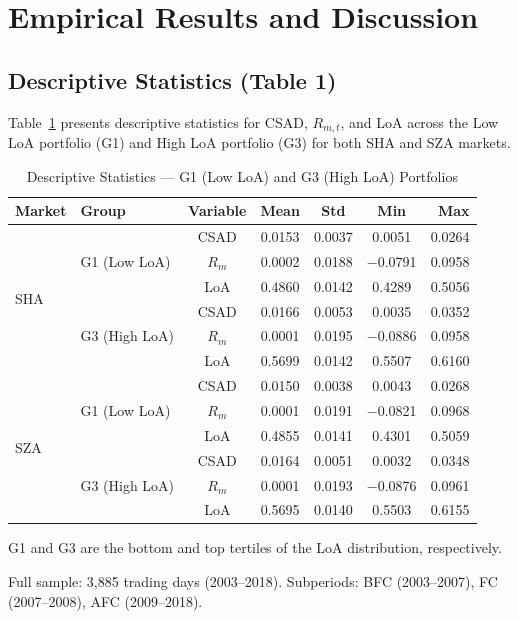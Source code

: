 \documentclass[12pt, a4paper]{article}
\begin{document}
\section{Empirical Results and Discussion}

\subsection{Descriptive Statistics (Table 1)}

Table~\ref{tab:descriptive} presents descriptive statistics for CSAD, $R_{m,t}$, and LoA across the Low LoA portfolio (G1) and High LoA portfolio (G3) for both SHA and SZA markets.

\begin{table}[H]
  \centering
  \caption{Descriptive Statistics — G1 (Low LoA) and G3 (High LoA) Portfolios}
  \label{tab:descriptive}
  \begin{threeparttable}
  \begin{tabular}{llccccr}
    \toprule
    Market & Group & Variable & Mean & Std & Min & Max \\
    \midrule
    \multirow{6}{*}{SHA}
      & \multirow{3}{*}{G1 (Low LoA)}
        & CSAD  & 0.0153 & 0.0037 & 0.0051 & 0.0264 \\
      & & $R_m$ & 0.0002 & 0.0188 & $-$0.0791 & 0.0958 \\
      & & LoA   & 0.4860 & 0.0142 & 0.4289 & 0.5056 \\
      & \multirow{3}{*}{G3 (High LoA)}
        & CSAD  & 0.0166 & 0.0053 & 0.0035 & 0.0352 \\
      & & $R_m$ & 0.0001 & 0.0195 & $-$0.0886 & 0.0958 \\
      & & LoA   & 0.5699 & 0.0142 & 0.5507 & 0.6160 \\
    \midrule
    \multirow{6}{*}{SZA}
      & \multirow{3}{*}{G1 (Low LoA)}
        & CSAD  & 0.0150 & 0.0038 & 0.0043 & 0.0268 \\
      & & $R_m$ & 0.0001 & 0.0191 & $-$0.0821 & 0.0968 \\
      & & LoA   & 0.4855 & 0.0141 & 0.4301 & 0.5059 \\
      & \multirow{3}{*}{G3 (High LoA)}
        & CSAD  & 0.0164 & 0.0051 & 0.0032 & 0.0348 \\
      & & $R_m$ & 0.0001 & 0.0193 & $-$0.0876 & 0.0961 \\
      & & LoA   & 0.5695 & 0.0140 & 0.5503 & 0.6155 \\
    \bottomrule
  \end{tabular}
  \begin{tablenotes}
    \footnotesize
    \item G1 and G3 are the bottom and top tertiles of the LoA distribution, respectively.
    \item Full sample: 3,885 trading days (2003--2018). Subperiods: BFC (2003--2007), FC (2007--2008), AFC (2009--2018).
  \end{tablenotes}
  \end{threeparttable}
\end{table}
\end{document}
